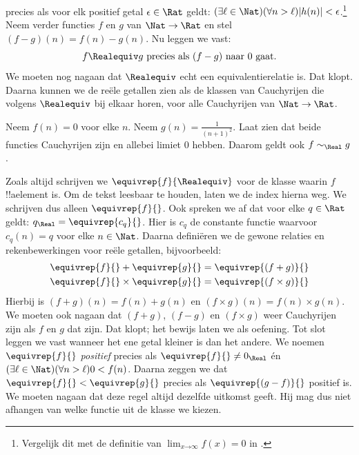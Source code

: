 \documentclass[openany]{memoir}
\begin{document}
precies als voor elk positief getal $\epsilon \in \Rat$ geldt:
$(\exists \ell \in \Nat)(\forall n > \ell)|h(n)| <
\epsilon$.\footnote{Vergelijk dit met de definitie van $\lim_{x
\mathord{\rightarrow}\infty}f(x) = 0$ in
.} Neem verder functies $f$ en $g$ van
$\Nat \to \Rat$ en stel $(f-g)(n) = f(n) - g(n)$. Nu leggen we vast:
\[
	f \Realequiv g \text{ precies als $(f-g)$ naar $0$ gaat}.
\]
We moeten nog nagaan dat $\Realequiv$ echt een equivalentierelatie is.
Dat klopt. Daarna kunnen we de reële getallen zien als de klassen van
Cauchyrijen die volgens $\Realequiv$ bij elkaar horen, voor alle
Cauchyrijen van $\Nat \to \Rat$.
\begin{prob}
Neem $f(n) = 0$ voor elke $n$. Neem $g(n) = \frac{1}{(n+1)^2}$. Laat
zien dat beide functies Cauchyrijen zijn en allebei limiet $0$ hebben.
Daarom geldt ook $f \sim_\Real g$.
\end{prob}
Zoals altijd schrijven we $\equivrep{f}{\Realequiv}$ voor de klasse
waarin $f$ !!a{element} is. Om de tekst leesbaar te houden, laten we de
index hierna weg. We schrijven dus alleen $\equivrep{f}{}$. Ook spreken
we af dat voor elke $q \in \Rat$ geldt: $q_{\Real} =
\equivrep{c_{q}}{}$. Hier is $c_{q}$ de constante functie waarvoor
$c_q(n) = q$ voor elke $n \in \Nat$. Daarna definiëren we de gewone
relaties en rekenbewerkingen voor reële getallen, bijvoorbeeld:
\begin{align*}
	\equivrep{f}{} + \equivrep{g}{} &= 	\equivrep{(f + g)}{} \\
	\equivrep{f}{} \times 	\equivrep{g}{} &= \equivrep{(f \times g)}{} 
\end{align*}
Hierbij is $(f + g)(n) = f(n) + g(n)$ en $(f \times g)(n) = f(n)
\times g(n)$. We moeten ook nagaan dat $(f + g)$, $(f-g)$ en $(f\times
g)$ weer Cauchyrijen zijn als $f$ en $g$ dat zijn. Dat klopt; het
bewijs laten we als oefening.
Tot slot leggen we vast wanneer het ene getal kleiner is dan het andere. We noemen $\equivrep{f}{}$
\emph{positief} precies als $\equivrep{f}{}\neq 0_\Real$ én $(\exists
\ell \in \Nat)(\forall n > \ell)0 < f(n)$. Daarna zeggen we dat
$\equivrep{f}{} < \equivrep{g}{}$ precies als $\equivrep{(g - f)}{}$
positief is. We moeten nagaan dat deze regel altijd dezelfde uitkomst
geeft. Hij mag dus niet afhangen van welke functie uit de klasse we kiezen.
\end{document}
